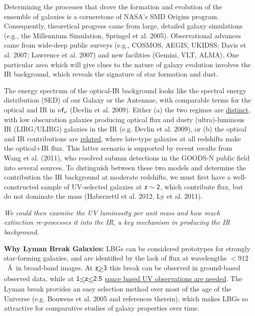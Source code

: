 \documentclass[12pt]{article}
\begin{document}
\hspace{0.1in}
Determining the processes that drove the formation and evolution of 
the ensemble of galaxies is a cornerstone of NASA's SMD Origins
program. Consequently, theoretical progress came from large, detailed
galaxy simulations (e.g., the Millennium Simulation, Springel et
al. 2005). Observational advances came from wide-deep public
surveys (e.g., COSMOS, AEGIS, UKIDSS; Davis et al. 2007; Lawrence et
al. 2007) and new facilities (Gemini, VLT, ALMA).
One particular area which will give clues to the nature of galaxy
evolution involves the IR background, which reveals the signature of star
formation and dust.

\hspace{0.1in}
The energy spectrum of the optical-IR background looks like the spectral
energy distribution (SED) of our Galaxy or the Antennae, with
comparable terms for the optical and IR in $\sf \nu f_{\nu}$ (Devlin
et al. 2009). Either (a) the two regimes are \underline{distinct}, with low
obscuration galaxies producing optical flux and dusty (ultra)-luminous
IR (LIRG/ULIRG)
galaxies in the IR (e.g. Devlin et al. 2009), or (b) the optical and IR
contributions are \underline{related}, where late-type galaxies at all
redshifts make the optical+IR flux. This latter scenario is
supported by recent results from Wang et al. (2011), who
resolved submm detections in the GOODS-N public field into several sources.
To distinguish between these two models and determine the contribution
the IR background at moderate redshifts, we must first have a
well-constructed sample of UV-selected galaxies at $\sf z\sim 2$,
which contribute flux, but do not dominate the mass
(Haberzettl et al. 2012, Ly et al. 2011).

{\it We could then examine the UV luminosity per unit mass and how
  much extinction re-processes it into the IR, a key mechanism in
  producing the IR background.} 

\hspace{0.1in}
{\bf Why Lyman Break Galaxies:}
LBGs can be considered prototypes for strongly star-forming galaxies,
and are identified by the lack of flux at wavelengths $< 912$~\AA\ in broad-band
images.
At
$\sf z\gsim 3$ this break can be observed in ground-based observed data,
while at $\sf 1\lsim z \lsim 2.5$ \underline{space based UV
observations are needed}. The Lyman break provides an easy selection method
over most of the age of the
Universe (e.g. Bouwens et al. 2005 and references therein), which
makes LBGs so attractive for
comparative studies of galaxy properties over time.
\end{document}
